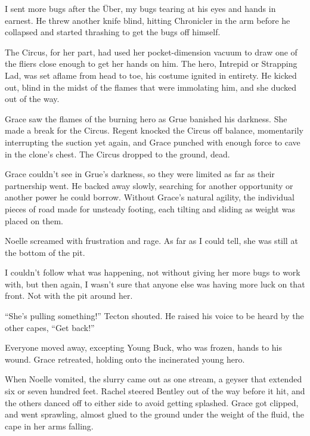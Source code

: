 I sent more bugs after the \"{U}ber, my bugs tearing at his eyes and hands in earnest.  He threw another knife blind, hitting Chronicler in the arm before he collapsed and started thrashing to get the bugs off himself.



The Circus, for her part, had used her pocket-dimension vacuum to draw one of the fliers close enough to get her hands on him.  The hero, Intrepid or Strapping Lad, was set aflame from head to toe, his costume ignited in entirety.  He kicked out, blind in the midst of the flames that were immolating him, and she ducked out of the way.



Grace saw the flames of the burning hero as Grue banished his darkness.  She made a break for the Circus.  Regent knocked the Circus off balance, momentarily interrupting the suction yet again, and Grace punched with enough force to cave in the clone's chest.  The Circus dropped to the ground, dead.



Grace couldn't see in Grue's darkness, so they were limited as far as their partnership went.  He backed away slowly, searching for another opportunity or another power he could borrow.  Without Grace's natural agility, the individual pieces of road made for unsteady footing, each tilting and sliding as weight was placed on them.



Noelle screamed with frustration and rage.  As far as I could tell, she was still at the bottom of the pit.



I couldn't follow what was happening, not without giving her more bugs to work with, but then again, I wasn't sure that anyone else was having more luck on that front.  Not with the pit around her.



``She's pulling something!'' Tecton shouted.  He raised his voice to be heard by the other capes, ``Get back!''



Everyone moved away, excepting Young Buck, who was frozen, hands to his wound.  Grace retreated, holding onto the incinerated young hero.



When Noelle vomited, the slurry came out as one stream, a geyser that extended six or seven hundred feet.  Rachel steered Bentley out of the way before it hit, and the others danced off to either side to avoid getting splashed.  Grace got clipped, and went sprawling, almost glued to the ground under the weight of the fluid, the cape in her arms falling.



